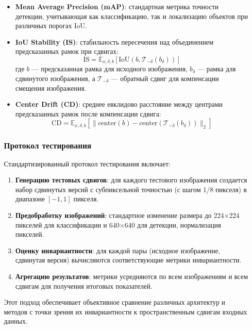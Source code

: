 \begin{itemize}
    \item \textbf{Mean Average Precision (mAP)}: стандартная метрика точности детекции, учитывающая как классификацию, так и локализацию объектов при различных порогах IoU.
    
    \item \textbf{IoU Stability (IS)}: стабильность пересечения над объединением предсказанных рамок при сдвигах:
    \begin{equation}
    \text{IS} = \mathbb{E}_{x, \delta, b} \left[ \text{IoU} \left( b, \mathcal{T}_{-\delta}(b_{\delta}) \right) \right]
    \end{equation}
    где $b$ — предсказанная рамка для исходного изображения, $b_{\delta}$ — рамка для сдвинутого изображения, а $\mathcal{T}_{-\delta}$ — обратный сдвиг для компенсации смещения изображения.
    
    \item \textbf{Center Drift (CD)}: среднее евклидово расстояние между центрами предсказанных рамок после компенсации сдвига:
    \begin{equation}
    \text{CD} = \mathbb{E}_{x, \delta, b} \left[ \| \text{center}(b) - \text{center}(\mathcal{T}_{-\delta}(b_{\delta})) \|_2 \right]
    \end{equation}
\end{itemize}

\subsubsection{Протокол тестирования}
\label{sec:evaluation:protocol}

Стандартизированный протокол тестирования включает:

\begin{enumerate}
    \item \textbf{Генерацию тестовых сдвигов}: для каждого тестового изображения создается набор сдвинутых версий с субпиксельной точностью (с шагом 1/8 пикселя) в диапазоне $[-1, 1]$ пикселя.
    
    \item \textbf{Предобработку изображений}: стандартное изменение размера до 224×224 пикселей для классификации и 640×640 для детекции, нормализация пикселей.
    
    \item \textbf{Оценку инвариантности}: для каждой пары (исходное изображение, сдвинутая версия) вычисляются соответствующие метрики инвариантности.
    
    \item \textbf{Агрегацию результатов}: метрики усредняются по всем изображениям и всем сдвигам для получения итоговых показателей.
\end{enumerate}

Этот подход обеспечивает объективное сравнение различных архитектур и методов с точки зрения их инвариантности к пространственным сдвигам входных данных.

\newpage
